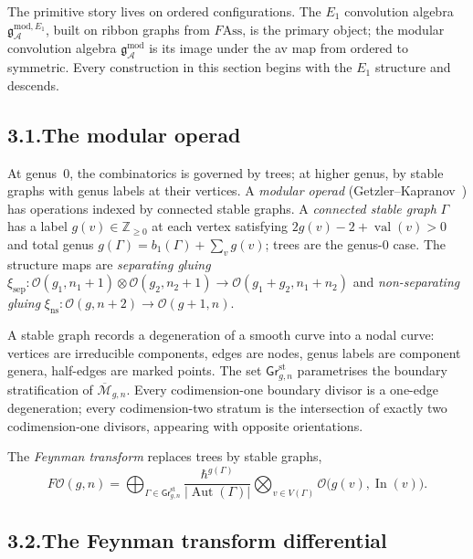 \documentclass[11pt]{report}
\theoremstyle{definition}
\theoremstyle{remark}
\providecommand{\cA}{\mathcal{A}}
\providecommand{\cM}{\mathcal{M}}
\providecommand{\cO}{\mathcal{O}}
\providecommand{\gAmod}{\mathfrak{g}^{\mathrm{mod}}_\cA}
\providecommand{\Ass}{\mathrm{Ass}}
\numberwithin{equation}{section}
\begin{document}
The primitive story lives on ordered configurations. The $E_1$
convolution algebra $\mathfrak g^{\mathrm{mod},E_1}_\cA$, built on
ribbon graphs from $F\!\Ass$, is the primary object; the modular
convolution algebra $\gAmod$ is its image under the av map from
ordered to symmetric. Every construction in this section begins with
the $E_1$ structure and descends.

\subsection*{3.1.\enspace The modular operad}

At genus~$0$, the combinatorics is governed by trees; at higher
genus, by stable graphs with genus labels at their vertices. A
\emph{modular operad} (Getzler--Kapranov~\cite{GeK98}) has operations
indexed by connected stable graphs. A \emph{connected stable graph}
$\Gamma$ has a label $g(v)\in\mathbb Z_{\ge 0}$ at each vertex
satisfying $2g(v)-2+\operatorname{val}(v)>0$ and total genus
$g(\Gamma)=b_1(\Gamma)+\sum_v g(v)$; trees are the genus-$0$ case.
The structure maps are \emph{separating gluing}
$\xi_{\mathrm{sep}}\colon\cO(g_1,n_1{+}1)\otimes\cO(g_2,n_2{+}1)\to\cO(g_1{+}g_2,n_1{+}n_2)$
and \emph{non-separating gluing}
$\xi_{\mathrm{ns}}\colon\cO(g,n{+}2)\to\cO(g{+}1,n)$.

A stable graph records a degeneration of a smooth curve into a nodal
curve: vertices are irreducible components, edges are nodes, genus
labels are component genera, half-edges are marked points. The set
$\mathsf{Gr}^{\mathrm{st}}_{g,n}$ parametrises the boundary
stratification of $\overline{\cM}_{g,n}$. Every codimension-one
boundary divisor is a one-edge degeneration; every codimension-two
stratum is the intersection of exactly two codimension-one divisors,
appearing with opposite orientations.

The \emph{Feynman transform} replaces trees by stable graphs,
\begin{equation}\label{eq:preface-feynman-sum}
F\cO(g,n)=\bigoplus_{\Gamma\in\mathsf{Gr}^{\mathrm{st}}_{g,n}}\frac{\hbar^{g(\Gamma)}}{|\operatorname{Aut}(\Gamma)|}\bigotimes_{v\in V(\Gamma)}\cO\bigl(g(v),\operatorname{In}(v)\bigr).
\end{equation}

\subsection*{3.2.\enspace The Feynman transform differential}
\end{document}
